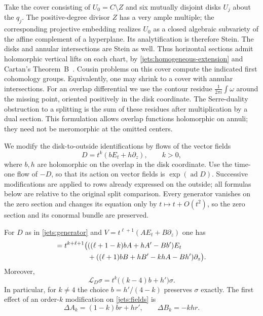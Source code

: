 Take the cover consisting of $U_0=C\setminus Z$ and six mutually
disjoint disks $U_j$ about the $q_j$. The positive-degree divisor $Z$
has a very ample multiple; the corresponding projective embedding
realizes $U_0$ as a closed algebraic subvariety of the affine complement
of a hyperplane. Its analytification is therefore Stein. The disks and
annular intersections are Stein as well.  Thus horizontal sections admit holomorphic vertical lifts
on each chart, by \eqref{jets:homogeneous-extension} and Cartan's
Theorem~B~\cite[\S4, Theorem~B]{Cartan1952}.  Cousin problems on this cover compute the indicated first
cohomology groups.  Equivalently, one may shrink to a cover with annular
intersections.  For an overlap differential we use the contour residue
$\frac1{2\pi i}\int\omega$ around the missing point, oriented positively
in the disk coordinate.  The Serre-duality obstruction to a splitting
is the sum of these residues after multiplication by a dual section.
This formulation allows overlap functions holomorphic on annuli; they
need not be meromorphic at the omitted centers.

We modify the disk-to-outside identifications by flows of the vector
fields
\begin{equation}\label{jets:generator}
 D=t^k(bE_t+h\partial_z),\qquad k>0,
\end{equation}
where $b,h$ are holomorphic on the overlap in the disk coordinate.
Use the time-one flow of $-D$, so that its action on vector fields is
$\exp(\operatorname{ad}D)$.  Successive modifications are applied to
rows already expressed on the outside; all formulas below are relative
to the original split comparison.  Every generator vanishes on the
zero section and changes its equation only by $t\mapsto t+O(t^2)$,
so the zero section and its conormal bundle are preserved.

\begin{lemma}\label{jets:bracket}
For $D$ as in \eqref{jets:generator} and
$V=t^{\ell+1}(AE_t+B\partial_z)$ one has
\begin{align}
 [D,V]=t^{k+\ell+1}\bigl(&((\ell+1-k)bA+hA'-Bb')E_t\notag\\
 &+((\ell+1)bB+hB'-khA-Bh')\partial_z\bigr).
 \label{jets:general-bracket}
\end{align}
Moreover,
\begin{equation}\label{jets:divergence}
 \mathcal L_D\sigma=t^k\bigl((k-4)b+h'\bigr)\sigma.
\end{equation}
In particular, for $k\ne4$ the choice $b=h'/(4-k)$ preserves $\sigma$
exactly.  The first effect of an order-$k$ modification on
\eqref{jets:fields} is
\begin{equation}\label{jets:leading-action}
 \Delta A_k=(1-k)br+hr',\qquad \Delta B_k=-khr.
\end{equation}
\end{lemma}

